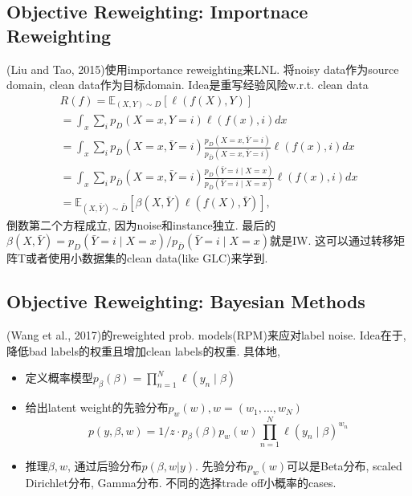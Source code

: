 \documentclass{article}
\begin{document}
\subsection{Objective Reweighting: Importnace Reweighting}

(Liu and Tao, 2015)使用importance reweighting来LNL. 将noisy data作为source domain, clean data作为目标domain. Idea是重写经验风险w.r.t. clean data
\begin{equation}
    \begin{array}{l}
    R(f)=\mathbb{E}_{(X, Y) \sim D}[\ell(f(X), Y)] \\
    =\int_{x} \sum_{i} p_{D}(X=x, Y=i) \ell(f(x), i) d x \\
    =\int_{x} \sum_{i} p_{\bar{D}}(X=x, \bar{Y}=i) \frac{p_{D}(X=x, \bar{Y}=i)}{p_{\bar{D}}(X=x, \bar{Y}=i)} \ell(f(x), i) d x \\
    =\int_{x} \sum_{i} p_{\bar{D}}(X=x, \bar{Y}=i) \frac{p_{D}(\bar{Y}=i \mid X=x)}{p_{\bar{D}}(\bar{Y}=i \mid X=x)} \ell(f(x), i) d x \\
    =\mathbb{E}_{(X, \bar{Y}) \sim \bar{D}}[\beta(X, \bar{Y}) \ell(f(X), \bar{Y})],
    \end{array}
\end{equation}
倒数第二个方程成立, 因为noise和instance独立. 最后的$\beta(X,\bar Y)=p_{D}(\bar{Y}=i \mid X=x) / p_{\bar{D}}(\bar{Y}=i \mid X=x)$就是IW.
这可以通过转移矩阵T或者使用小数据集的clean data(like GLC)来学到.

\subsection{Objective Reweighting: Bayesian Methods}

(Wang et al., 2017)的reweighted prob. models(RPM)来应对label noise. Idea在于, 降低bad labels的权重且增加clean labels的权重. 具体地,
\begin{itemize}
    \item 定义概率模型$p_{\beta}(\beta)=\prod_{n=1}^{N} \ell\left(y_{n} \mid \beta\right)$
    \item 给出latent weight的先验分布$p_w(w), w=(w_1,\dots, w_N)$
    \begin{equation}
        p(y, \beta, w)=1 / z \cdot p_{\beta}(\beta) p_{w}(w) \prod_{n=1}^{N} \ell\left(y_{n} \mid \beta\right)^{w_{n}}
    \end{equation}
    \item 推理$\beta, w$, 通过后验分布$p(\beta, w| y)$. 先验分布$p_w(w)$可以是Beta分布, scaled Dirichlet分布, Gamma分布. 不同的选择trade off小概率的cases.
\end{itemize}
\end{document}
